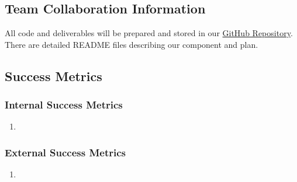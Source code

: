 \subsection*{Team Collaboration Information}
All code and deliverables will be prepared and stored in our \href{https://github.com/justinottesen/LSPT-Evaluation}{GitHub Repository}. There are detailed README files describing our component and plan.

\subsection*{Success Metrics}
\subsubsection*{Internal Success Metrics}
\begin{enumerate}
  \item 
\end{enumerate}

\subsubsection*{External Success Metrics}
\begin{enumerate}
  \item 
\end{enumerate}
